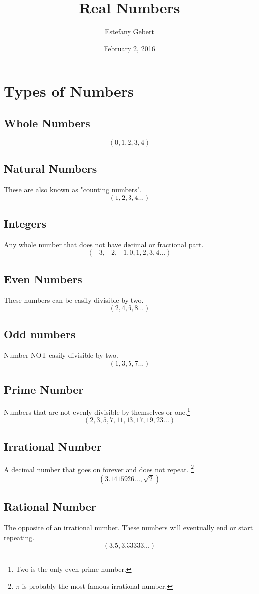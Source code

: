\documentclass[]{article}
\title{Real Numbers}
\date{February 2, 2016}
\author{Estefany Gebert}
\begin{document}
\maketitle

\tableofcontents
\pagebreak

\section{Types of Numbers}
\subsection{Whole Numbers}
$$ (0,1,2,3,4)$$
\subsection{Natural Numbers}
These are also known as "counting numbers". $$(1,2,3,4...)$$
\subsection{Integers}
Any whole number that does not have decimal or fractional part.
$$(-3,-2,-1,0,1,2,3,4...)$$
\subsection{Even Numbers}
These numbers can be easily divisible by two.
$$(2,4,6,8...)$$
\subsection{Odd numbers}
Number NOT easily divisible by two.
$$(1,3,5,7...)$$
\subsection{Prime Number}
Numbers that are not evenly divisible by themselves or one.\footnote{Two is the only even prime number.}
$$(2,3,5,7,11,13,17,19,23...)$$
\subsection{Irrational Number}
A decimal number that goes on forever and does not repeat. \footnote{$\pi$ is probably the most famous irrational number.}
$$(3.1415926..., \sqrt 2)$$
\subsection{Rational Number}
The opposite of an irrational number. These numbers will eventually end or start repeating.
$$(3.5,3.33333...)$$
\end{document}
